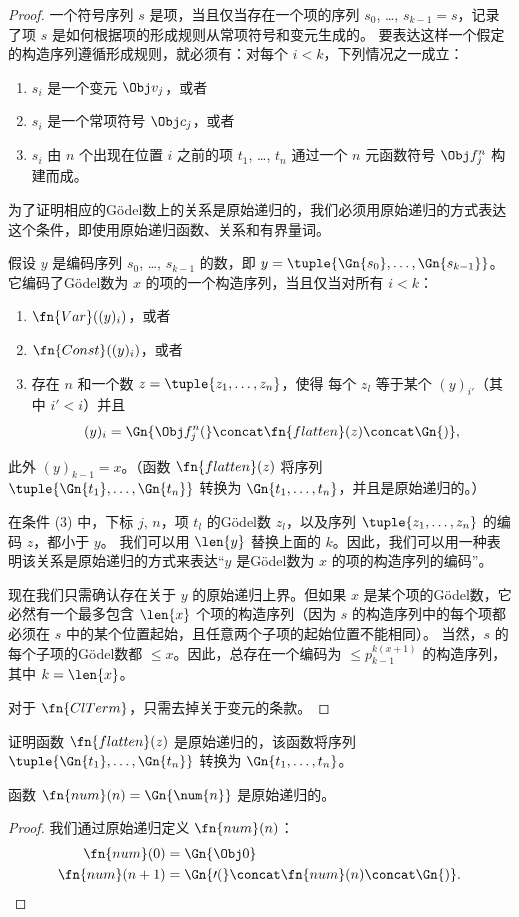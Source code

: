 \documentclass[../../../include/open-logic-section]{subfiles}
\begin{document}
\begin{proof}
一个符号序列 $s$ 是项，当且仅当存在一个项的序列 $s_0$, \dots,
$s_{k-1} = s$，记录了项 $s$ 是如何根据项的形成规则从常项符号和变元生成的。
要表达这样一个假定的构造序列遵循形成规则，就必须有：对每个 $i < k$，下列情况之一成立：
\begin{enumerate}
\item $s_i$ 是一个变元 $\Obj v_j$，或者
\item $s_i$ 是一个常项符号 $\Obj c_j$，或者
\item $s_i$ 由 $n$ 个出现在位置 $i$ 之前的项 $t_1$, \dots, $t_n$ 通过一个 $n$ 元函数符号 $\Obj f^n_j$ 构建而成。
\end{enumerate}
为了证明相应的Gödel数上的关系是原始递归的，我们必须用原始递归的方式表达这个条件，即使用原始递归函数、关系和有界量词。

假设 $y$ 是编码序列 $s_0$, \dots, $s_{k-1}$ 的数，即 $y = \tuple{\Gn{s_0}, \dots, \Gn{s_{k-1}}}$。它编码了Gödel数为 $x$ 的项的一个构造序列，当且仅当对所有 $i < k$：
\begin{enumerate}
\item $\fn{Var}((y)_i)$，或者
\item $\fn{Const}((y)_i)$，或者
\item 存在 $n$ 和一个数 $z = \tuple{z_1, \dots, z_n}$，使得
  每个 $z_l$ 等于某个 $(y)_{i'}$（其中 $i' < i$）并且
\[
(y)_i = \Gn{\Obj f^n_j(} \concat \fn{flatten}(z) \concat \Gn{)},
\]
\end{enumerate}
此外 $(y)_{k-1} = x$。（函数 $\fn{flatten}(z)$ 将序列 $\tuple{\Gn{t_1}, \dots, \Gn{t_n}}$ 转换为 $\Gn{t_1, \dots,
  t_n}$，并且是原始递归的。）

在条件 (3) 中，下标 $j$, $n$，项 $t_l$ 的Gödel数 $z_l$，以及序列 $\tuple{z_1, \dots, z_n}$ 的编码 $z$，都小于 $y$。
我们可以用 $\len{y}$ 替换上面的 $k$。因此，我们可以用一种表明该关系是原始递归的方式来表达“$y$ 是Gödel数为 $x$ 的项的构造序列的编码”。

现在我们只需确认存在关于 $y$ 的原始递归上界。但如果 $x$ 是某个项的Gödel数，它必然有一个最多包含 $\len{x}$ 个项的构造序列（因为 $s$ 的构造序列中的每个项都必须在 $s$ 中的某个位置起始，且任意两个子项的起始位置不能相同）。
当然，$s$ 的每个子项的Gödel数都 $\le x$。因此，总存在一个编码为 $\le p_{k-1}^{k(x+1)}$ 的构造序列，其中 $k=\len{x}$。

对于 $\fn{ClTerm}$，只需去掉关于变元的条款。
\end{proof}

\begin{prob}
证明函数 $\fn{flatten}(z)$ 是原始递归的，该函数将序列 $\tuple{\Gn{t_1}, \dots, \Gn{t_n}}$ 转换为 $\Gn{t_1, \dots, t_n}$。
\end{prob}

\begin{prop}
  函数 $\fn{num}(n) = \Gn{\num{n}}$ 是原始递归的。
\end{prop}

\begin{proof}
  我们通过原始递归定义 $\fn{num}(n)$：
  \begin{align*}
    \fn{num}(0) & = \Gn{\Obj 0}\\
    \fn{num}(n+1) & = \Gn{\prime(} \concat \fn{num}(n) \concat \Gn{)}.
  \end{align*}
\end{proof}
\end{document}
